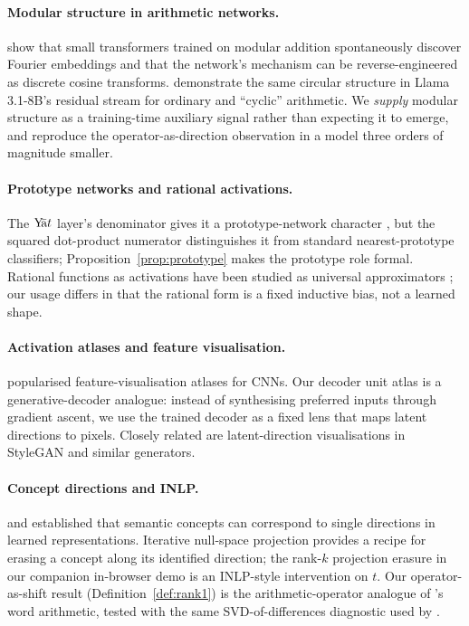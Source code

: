\documentclass[11pt]{article}
\theoremstyle{papsty}
\newcommand{\yat}{$\textnormal{Y}\!\bar{\text{a}}t$}
\begin{document}
\paragraph{Modular structure in arithmetic networks.}
\citet{nanda2023progress} show that small transformers trained on
modular addition spontaneously discover Fourier embeddings and that the
network's mechanism can be reverse-engineered as discrete cosine
transforms. \citet{goodfire2025geometric} demonstrate the same circular
structure in Llama 3.1-8B's residual stream for ordinary and ``cyclic''
arithmetic. We \emph{supply} modular structure as a training-time
auxiliary signal rather than expecting it to emerge, and reproduce the
operator-as-direction observation in a model three orders of magnitude
smaller.

\paragraph{Prototype networks and rational activations.}
The \yat{} layer's denominator gives it a prototype-network character
\citep{snell2017prototypical,li2018deep}, but the squared dot-product
numerator distinguishes it from standard nearest-prototype classifiers;
Proposition~\ref{prop:prototype} makes the prototype role formal.
Rational functions as activations have been studied as universal
approximators \citep{boulle2020rational}; our usage differs in that the
rational form is a fixed inductive bias, not a learned shape.

\paragraph{Activation atlases and feature visualisation.}
\citet{olah2017feature} popularised feature-visualisation atlases for
CNNs. Our decoder unit atlas is a generative-decoder analogue: instead
of synthesising preferred inputs through gradient ascent, we use the
trained decoder as a fixed lens that maps latent directions to pixels.
Closely related are latent-direction visualisations in StyleGAN and
similar generators.

\paragraph{Concept directions and INLP.}
\citet{mikolov2013distributed} and \citet{kim2018interpretability}
established that semantic concepts can correspond to single directions
in learned representations. Iterative null-space projection
\citep{ravfogel2020null} provides a recipe for erasing a concept along
its identified direction; the rank-$k$ projection erasure in our
companion in-browser demo is an INLP-style intervention on $t$.
Our operator-as-shift result (Definition~\ref{def:rank1}) is the
arithmetic-operator analogue of \citet{mikolov2013distributed}'s word
arithmetic, tested with the same SVD-of-differences diagnostic used by
\citet{goodfire2025geometric}.
\end{document}

